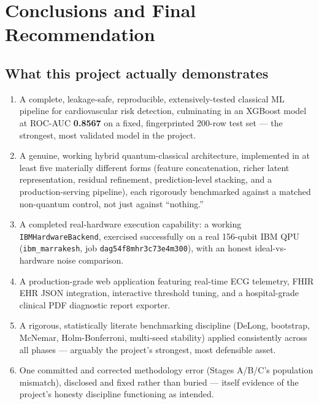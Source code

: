 \documentclass[11pt,a4paper]{article}
\newcommand{\code}[1]{\texttt{\small #1}}
\begin{document}
\section{Conclusions and Final Recommendation}
\label{sec:conclusions}

\subsection{What this project actually demonstrates}
\begin{enumerate}[leftmargin=1.4em]
  \item A complete, leakage-safe, reproducible, extensively-tested classical ML pipeline for cardiovascular risk detection, culminating in an XGBoost model at ROC-AUC \textbf{0.8567} on a fixed, fingerprinted 200-row test set --- the strongest, most validated model in the project.
  \item A genuine, working hybrid quantum-classical architecture, implemented in at least five materially different forms (feature concatenation, richer latent representation, residual refinement, prediction-level stacking, and a production-serving pipeline), each rigorously benchmarked against a matched non-quantum control, not just against ``nothing.''
  \item A completed real-hardware execution capability: a working \code{IBMHardwareBackend}, exercised successfully on a real 156-qubit IBM QPU (\code{ibm\_marrakesh}, job \code{dag54f8mhr3c73e4m300}), with an honest ideal-vs-hardware noise comparison.
  \item A production-grade web application featuring real-time ECG telemetry, FHIR EHR JSON integration, interactive threshold tuning, and a hospital-grade clinical PDF diagnostic report exporter.
  \item A rigorous, statistically literate benchmarking discipline (DeLong, bootstrap, McNemar, Holm-Bonferroni, multi-seed stability) applied consistently across all phases --- arguably the project's strongest, most defensible asset.
  \item One committed and corrected methodology error (Stages A/B/C's population mismatch), disclosed and fixed rather than buried --- itself evidence of the project's honesty discipline functioning as intended.
\end{enumerate}
\end{document}
